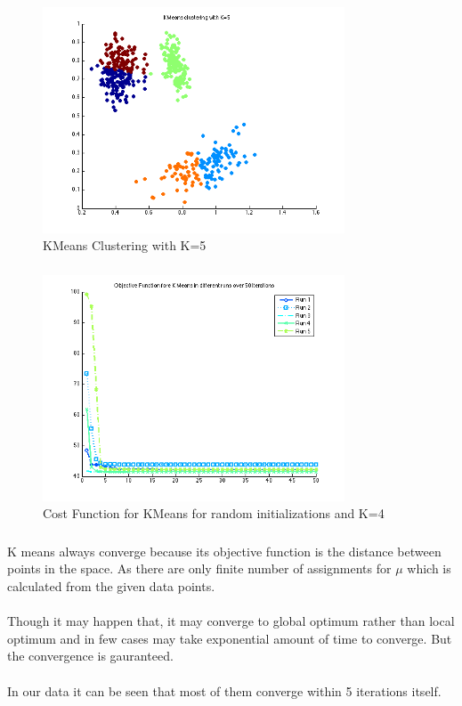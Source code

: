 \documentclass[paper=a4, fontsize=11pt]{scrartcl} %
\numberwithin{equation}{section} %
\numberwithin{figure}{section} %
\numberwithin{table}{section} %
\begin{document}
\begin{figure}[h!]
  \centering
    \includegraphics[width=0.8\textwidth]{../figures/k5.png}
  \caption{KMeans Clustering with K=5}
\end{figure}

\subsubsection{}
\begin{figure}[h!]
  \centering
    \includegraphics[width=0.8\textwidth]{../figures/fig5_1_b.png}
  \caption{Cost Function for KMeans for random initializations and K=4}
\end{figure}


\subsubsection{}
K means always converge because its objective function is the distance between points in the space. As there are only finite number of assignments for $\mu$ which is calculated from the given data points.\\\\
Though it may happen that, it may converge to global optimum rather than local optimum and in few cases may take exponential amount of time to converge. But the convergence is gauranteed.\\\\
In our data it can be seen that most of them converge within 5 iterations itself.
\end{document}
